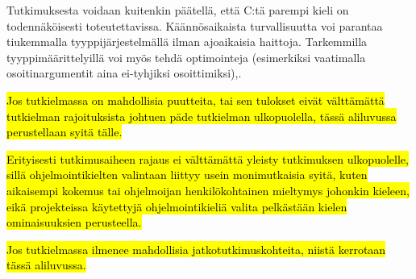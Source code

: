 Tutkimuksesta voidaan kuitenkin päätellä, että C:tä parempi kieli on
todennäköisesti toteutettavissa. Käännösaikaista turvallisuutta voi parantaa
tiukemmalla tyyppijärjestelmällä ilman ajoaikaisia haittoja. Tarkemmilla
tyyppimäärittelyillä voi myös tehdä optimointeja (esimerkiksi vaatimalla
osoitinargumentit aina ei-tyhjiksi osoittimiksi),.

\hl{Jos tutkielmassa on mahdollisia puutteita, tai sen tulokset eivät
välttämättä tutkielman rajoituksista johtuen päde tutkielman ulkopuolella,
tässä aliluvussa perustellaan syitä tälle.}

\hl{Erityisesti tutkimusaiheen rajaus ei välttämättä yleisty tutkimuksen
ulkopuolelle, sillä ohjelmointikielten valintaan liittyy usein monimutkaisia
syitä, kuten aikaisempi kokemus tai ohjelmoijan henkilökohtainen mieltymys
johonkin kieleen, eikä projekteissa käytettyjä ohjelmointikieliä valita
pelkästään kielen ominaisuuksien perusteella.}

\hl{Jos tutkielmassa ilmenee mahdollisia jatkotutkimuskohteita, niistä
kerrotaan tässä aliluvussa.}
